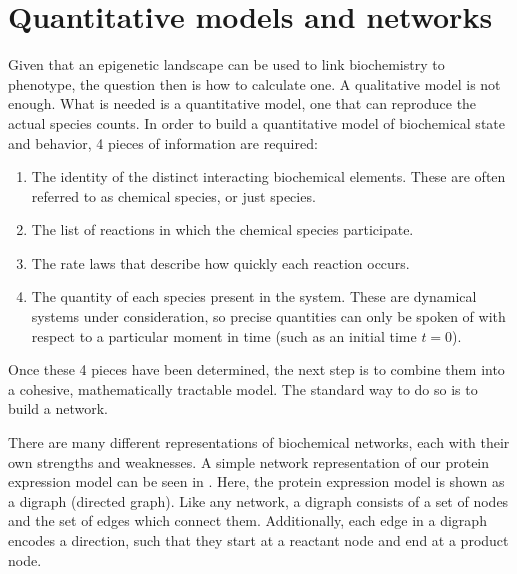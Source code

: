 \section{Quantitative models and networks}
\label{sec:quant_models}

Given that an epigenetic landscape can be used to link biochemistry to phenotype, the question then is how to calculate one. A qualitative model is not enough. What is needed is a quantitative model, one that can reproduce the actual species counts. In order to build a quantitative model of biochemical state and behavior, 4 pieces of information are required:
\begin{enumerate}
    \item\label{item:species} The identity of the distinct interacting biochemical elements. These are often referred to as chemical species, or just species.
    \item The list of reactions in which the chemical species participate.
    \item The rate laws that describe how quickly each reaction occurs. 
    \item The quantity of each species present in the system. These are dynamical systems under consideration, so precise quantities can only be spoken of with respect to a particular moment in time (such as an initial time $t=0$).
\end{enumerate}
Once these 4 pieces have been determined, the next step is to combine them into a cohesive, mathematically tractable model. The standard way to do so is to build a network.

There are many different representations of biochemical networks, each with their own strengths and weaknesses. A simple network representation of our protein expression model can be seen in . Here, the protein expression model is shown as a digraph (directed graph). Like any network, a digraph consists of a set of nodes and the set of edges which connect them. Additionally, each edge in a digraph encodes a direction, such that they start at a reactant node and end at a product node.

